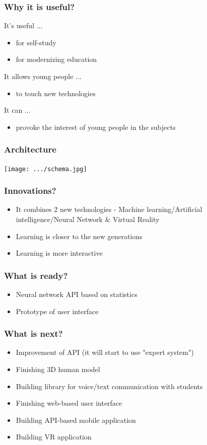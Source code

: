 \documentclass[12pt]{beamer}
\begin{document}
	\begin{frame}
		\frametitle{Why it is useful?}
		\begin{block}{It's useful ...}
			\begin{itemize}
				\item for self-study
				\item for modernizing education
			\end{itemize}
		\end{block}
		\begin{block}{It allows young people ...}
			\begin{itemize}
				\item to touch new technologies
			\end{itemize}
		\end{block}
		\begin{block}{It can ...}
			\begin{itemize}
				\item provoke the interest of young people in the subjects
			\end{itemize}
		\end{block}
	\end{frame}
	\begin{frame}
		\frametitle{Architecture}
		\texttt{[image: .../schema.jpg]}
	\end{frame}
	\begin{frame}
		\frametitle{Innovations?}
		\begin{itemize}
			\item It combines 2 new technologies - Machine learning/Artificial intelligence/Neural Network \& Virtual Reality
			\item Learning is closer to the new generations
			\item Learning is more interactive
		\end{itemize}
	\end{frame}
	\begin{frame}
		\frametitle{What is ready?}
		\begin{itemize}
			\item Neural network API based on statistics
			\item Prototype of user interface
		\end{itemize}
	\end{frame}
	\begin{frame}
		\frametitle{What is next?}
		\begin{itemize}
			\item Improvement of API (it will start to use "expert system") 
			\item Finishing 3D human model
			\item Building library for voice/text communication with students
			\item Finishing web-based user interface
			\item Building API-based mobile application
			\item Building VR application
		\end{itemize}
	\end{frame}
\end{document}
